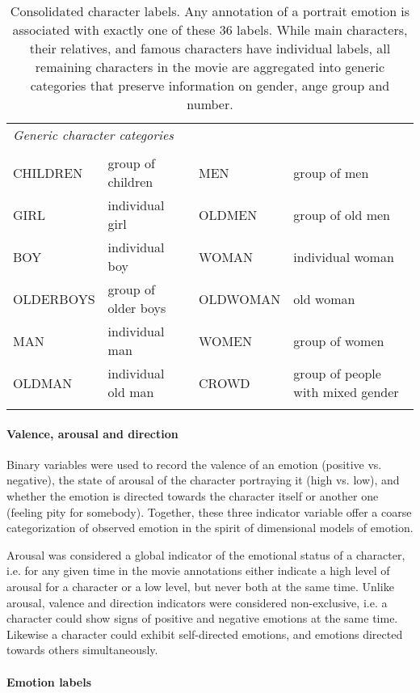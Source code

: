 \begin{table}
\begin{tabular}{p{4cm}p{4cm}p{3.6cm}p{4cm}}
\multicolumn{4}{l}{\textit{Generic character categories}} \\\\
CHILDREN  & group of children & MEN      & group of men \\
GIRL      & individual girl & OLDMEN   & group of old men \\
BOY       & individual boy & WOMAN    & individual woman \\
OLDERBOYS & group of older boys & OLDWOMAN & old woman\\
MAN       & individual man & WOMEN    & group of women \\
OLDMAN    & individual old man & CROWD    & group of people with mixed gender \\
 \\\hline
  \end{tabular}
  \caption{Consolidated character labels. Any annotation of a portrait emotion
  is associated with exactly one of these 36 labels. While main characters,
  their relatives, and famous characters have individual labels, all remaining
  characters in the movie are aggregated into generic categories that preserve
  information on gender, ange group and number.}
  \label{tab:characters}
\end{table}

\paragraph{Valence, arousal and direction}

Binary variables were used to record the valence of an emotion (positive vs.
negative), the state of arousal of the character portraying it (high vs. low),
and whether the emotion is directed towards the character itself or another one
(feeling pity for somebody). Together, these three indicator variable offer a
coarse categorization of observed emotion in the spirit of dimensional models
of emotion.

Arousal was considered a global indicator of the emotional status of a
character, i.e. for any given time in the movie annotations either indicate a
high level of arousal for a character or a low level, but never both at the
same time. Unlike arousal, valence and direction indicators were considered
non-exclusive, i.e. a character could show signs of positive and negative
emotions at the same time. Likewise a character could exhibit self-directed
emotions, and emotions directed towards others simultaneously.

\paragraph{Emotion labels}

